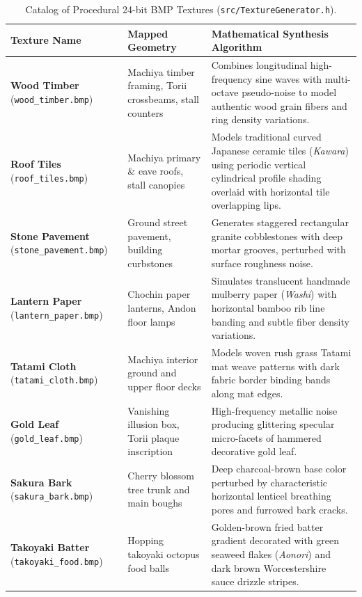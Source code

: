 \begin{table}[H]
\centering
\small
\begin{tabularx}{\textwidth}{p{3.0cm} p{4.2cm} p{7.0cm}}
\toprule
\textbf{Texture Name} & \textbf{Mapped Geometry} & \textbf{Mathematical Synthesis Algorithm} \\
\midrule
\textbf{Wood Timber} \newline (\texttt{wood\_timber.bmp}) &
Machiya timber framing, Torii crossbeams, stall counters &
Combines longitudinal high-frequency sine waves with multi-octave pseudo-noise to model authentic wood grain fibers and ring density variations. \\
\addlinespace
\textbf{Roof Tiles} \newline (\texttt{roof\_tiles.bmp}) &
Machiya primary \& eave roofs, stall canopies &
Models traditional curved Japanese ceramic tiles (\textit{Kawara}) using periodic vertical cylindrical profile shading overlaid with horizontal tile overlapping lips. \\
\addlinespace
\textbf{Stone Pavement} \newline (\texttt{stone\_pavement.bmp}) &
Ground street pavement, building curbstones &
Generates staggered rectangular granite cobblestones with deep mortar grooves, perturbed with surface roughness noise. \\
\addlinespace
\textbf{Lantern Paper} \newline (\texttt{lantern\_paper.bmp}) &
Chochin paper lanterns, Andon floor lamps &
Simulates translucent handmade mulberry paper (\textit{Washi}) with horizontal bamboo rib line banding and subtle fiber density variations. \\
\addlinespace
\textbf{Tatami Cloth} \newline (\texttt{tatami\_cloth.bmp}) &
Machiya interior ground and upper floor decks &
Models woven rush grass Tatami mat weave patterns with dark fabric border binding bands along mat edges. \\
\addlinespace
\textbf{Gold Leaf} \newline (\texttt{gold\_leaf.bmp}) &
Vanishing illusion box, Torii plaque inscription &
High-frequency metallic noise producing glittering specular micro-facets of hammered decorative gold leaf. \\
\addlinespace
\textbf{Sakura Bark} \newline (\texttt{sakura\_bark.bmp}) &
Cherry blossom tree trunk and main boughs &
Deep charcoal-brown base color perturbed by characteristic horizontal lenticel breathing pores and furrowed bark cracks. \\
\addlinespace
\textbf{Takoyaki Batter} \newline (\texttt{takoyaki\_food.bmp}) &
Hopping takoyaki octopus food balls &
Golden-brown fried batter gradient decorated with green seaweed flakes (\textit{Aonori}) and dark brown Worcestershire sauce drizzle stripes. \\
\bottomrule
\end{tabularx}
\caption{Catalog of Procedural 24-bit BMP Textures (\texttt{src/TextureGenerator.h}).}
\label{tab:procedural_textures}
\end{table}

